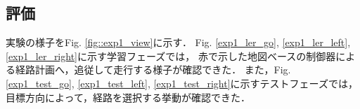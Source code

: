 

\subsection{評価}
実験の様子をFig. \ref{fig::exp1_view}に示す．
Fig. \ref{exp1_ler_go}, \ref{exp1_ler_left}, \ref{exp1_ler_right}に示す学習フェーズでは，
赤で示した地図ベースの制御器による経路計画へ，追従して走行する様子が確認できた．
また，Fig. \ref{exp1_test_go}, \ref{exp1_test_left}, \ref{exp1_test_right}に示すテストフェーズでは，
目標方向によって，経路を選択する挙動が確認できた．
